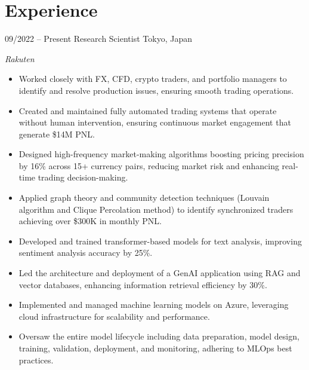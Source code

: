 

\section{Experience}
\begin{entrylist}
\entry
{09/2022 -- Present}
{Research Scientist}
{Tokyo, Japan}
{\emph{Rakuten}
\begin{itemize}
    \item Worked closely with FX, CFD, crypto traders, and portfolio managers to identify and resolve production issues, ensuring smooth trading operations.
    \item Created and maintained fully automated trading systems that operate without human intervention, ensuring continuous market engagement that generate \$14M PNL.
	\item Designed high-frequency market-making algorithms boosting pricing precision by 16\% across 15+ currency pairs, reducing market risk and enhancing real-time trading decision-making.
    \item Applied graph theory and community detection techniques (Louvain algorithm and Clique Percolation method) to identify synchronized traders achieving over \$300K in monthly PNL.
  	\item Developed and trained transformer-based models for text analysis, improving sentiment analysis accuracy by 25\%.
	\item Led the architecture and deployment of a GenAI application using RAG and vector databases, enhancing information retrieval efficiency by 30\%.
    \item Implemented and managed machine learning models on Azure, leveraging cloud infrastructure for scalability and performance.
	\item Oversaw the entire model lifecycle including data preparation, model design, training, validation, deployment, and monitoring, adhering to MLOps best practices.
\end{itemize}
}
\end{entrylist}


